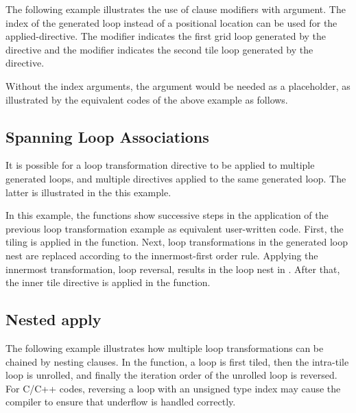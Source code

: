 The following example illustrates the use of  clause 
modifiers with argument. The index of the generated loop instead of
a positional location can be used for the applied-directive. 
The  modifier indicates the first grid loop 
generated by the  directive
and the  modifier indicates the second tile loop
generated by the  directive.

\pagebreak
{}

Without the index arguments, the  argument would
be needed as a placeholder, as illustrated by the equivalent codes
of the above example as follows.

\pagebreak
{}


\subsection{Spanning Loop Associations}

It is possible for a loop transformation directive to be applied to multiple generated loops,
and multiple directives applied to the same generated loop.
The latter is illustrated in the this example.


In this example, the functions show successive steps in the application of
the previous loop transformation example as equivalent user-written code.
First, the tiling is applied in the  function.
Next, loop transformations in the generated loop nest are replaced according to the innermost-first order rule.
Applying the innermost transformation, loop reversal, results in the loop nest in .
After that, the inner tile directive is applied in the  function.




\subsection{Nested apply}

The following example illustrates how multiple loop transformations can be chained by nesting  clauses.
In the  function, a loop is first tiled, then the intra-tile
loop is unrolled, and finally the iteration order of the unrolled loop is reversed.
For C/C++ codes, reversing a loop with an unsigned type index may cause the compiler
to ensure that underflow is handled correctly.

